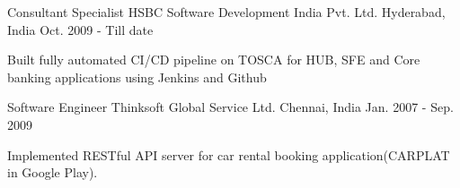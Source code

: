 

\begin{cventries}

  \cventry
    {Consultant Specialist} %
    {HSBC Software Development India Pvt. Ltd.} %
    {Hyderabad, India} %
    {Oct. 2009 - Till date} %
    {
      \begin{cvitems} %
        \item {Built fully automated CI/CD pipeline on TOSCA for HUB, SFE and Core banking applications using Jenkins and Github}
      \end{cvitems}
    }

  \cventry
    {Software Engineer} %
    {Thinksoft Global Service Ltd.} %
    {Chennai, India} %
    {Jan. 2007 - Sep. 2009} %
    {
      \begin{cvitems} %
        \item {Implemented RESTful API server for car rental booking application(CARPLAT in Google Play).}
      \end{cvitems}
    }
\end{cventries}
